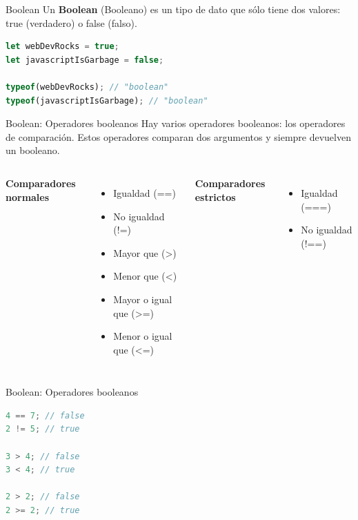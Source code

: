 \documentclass{beamer}
\begin{document}
\begin{frame}[fragile]{Boolean}
Un \textbf{Boolean} (Booleano) es un tipo de dato que sólo tiene dos valores: true (verdadero) o false (falso).\pause

\begin{lstlisting}[language=JavaScript]
let webDevRocks = true;
let javascriptIsGarbage = false;

typeof(webDevRocks); // "boolean"
typeof(javascriptIsGarbage); // "boolean"

\end{lstlisting}
\end{frame}

\begin{frame}{Boolean: Operadores booleanos}
Hay varios operadores booleanos: los operadores de comparación. Estos operadores comparan dos argumentos y siempre devuelven un booleano. \bigskip\pause

\begin{columns}[t, onlytextwidth]
                \textbf{Comparadores normales}
                \begin{itemize}
                    \item Igualdad (==)
                    \item No igualdad (!=)
                    \item Mayor que (>)
                    \item Menor que (<)
                    \item Mayor o igual que (>=)
                    \item Menor o igual que (<=)
                \end{itemize}\pause
            
                \textbf{Comparadores estrictos}
                \begin{itemize}
                    \item Igualdad (===)
                    \item No igualdad (!==)
                \end{itemize}
        \end{columns}
\end{frame}

\begin{frame}[fragile]{Boolean: Operadores booleanos}
\begin{lstlisting}[language=JavaScript]
4 == 7; // false
2 != 5; // true

3 > 4; // false
3 < 4; // true

2 > 2; // false
2 >= 2; // true
\end{lstlisting}
\end{frame}
\end{document}
